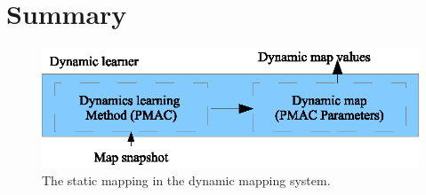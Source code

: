 \section{Summary}


\begin{figure}[htbp]
	\centering
	\includegraphics[scale=1]{chapters/mapping_of_dynamic_areas/figures/dynamic_detail.eps}
	\caption{The static mapping in the dynamic mapping system.}
	\label{fig:dynamic_learner_detail}
\end{figure}